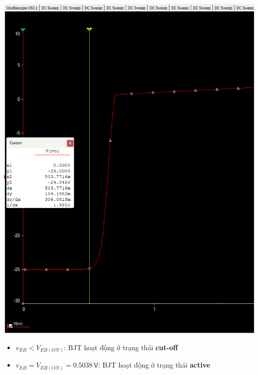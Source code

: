 \begin{minipage}{.4\linewidth}
	\includegraphics[width=\linewidth]{./my-chapters/my-images/Question2/a_VBE.png}
\end{minipage}
\begin{minipage}{.4\linewidth}
	\begin{itemize}[label=-]
		\item $v_{EB}<V_{EB(ON)}$: BJT hoạt động ở trạng thái \textbf{cut-off}
		\item $v_{EB}=V_{EB(ON)}=0.5038\,\textsf{V}$: BJT hoạt động ở trạng thái \textbf{active}
	\end{itemize}
\end{minipage}

